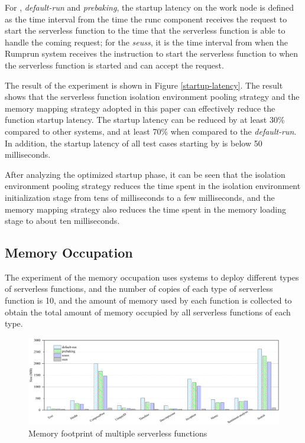 For \pname, \textit{default-run} and \textit{prebaking}, 
the startup latency on the work node is defined as the time 
interval from the time the runc component receives the request 
to start the serverless function to the time that the 
serverless function is able to handle the coming request; 
for the \textit{seuss}, it is the time interval from when the Rumprun 
system receives the instruction to start the 
serverless function to when the serverless function is started and can accept the request.

The result of the experiment is shown in Figure \ref{startup-latency}. 
The result shows that the serverless function isolation environment pooling strategy and the memory mapping strategy adopted 
in this paper can effectively reduce the function startup latency. 
The startup latency can be reduced by at least 30\% compared to other systems, 
and at least 70\% when compared to the \textit{default-run}.
In addition, the startup latency of all test cases starting by \pname is below 50 milliseconds.

After analyzing the optimized startup phase, 
it can be seen that the isolation environment 
pooling strategy reduces the time spent in the 
isolation environment initialization stage from 
tens of milliseconds to a few milliseconds, 
and the memory mapping strategy also reduces the time spent 
in the memory loading stage to about ten milliseconds.

\subsection{Memory Occupation}

The experiment of the memory occupation uses systems to deploy 
different types of serverless functions, 
and the number of copies of each type of serverless function is 10, 
and the amount of memory used by each function is collected to 
obtain the total amount of memory occupied by all serverless functions of each type.

\begin{figure}[t]
    \centering
    \includegraphics[width=\linewidth]{images/memory.png}
    \caption{Memory footprint of multiple serverless functions}
    \label{memory}
\end{figure}

